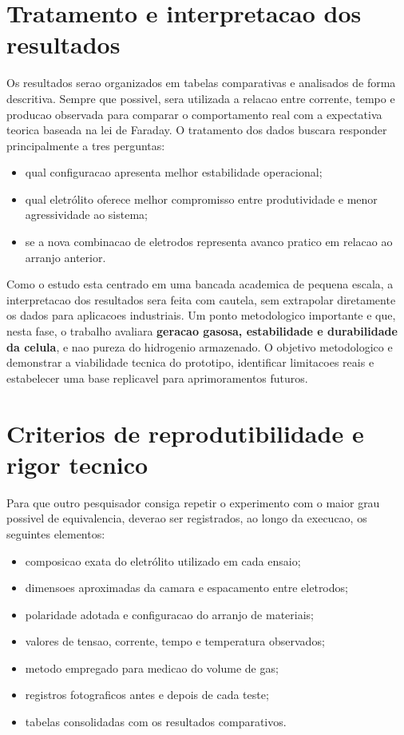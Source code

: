 \documentclass[12pt,oneside,a4paper,brazilian]{abntex2}
\begin{document}
\section{Tratamento e interpretacao dos resultados}

Os resultados serao organizados em tabelas comparativas e analisados de forma descritiva. Sempre que possivel, sera utilizada a relacao entre corrente, tempo e producao observada para comparar o comportamento real com a expectativa teorica baseada na lei de Faraday. O tratamento dos dados buscara responder principalmente a tres perguntas:

\begin{itemize}
  \item qual configuracao apresenta melhor estabilidade operacional;
  \item qual eletrólito oferece melhor compromisso entre produtividade e menor agressividade ao sistema;
  \item se a nova combinacao de eletrodos representa avanco pratico em relacao ao arranjo anterior.
\end{itemize}

Como o estudo esta centrado em uma bancada academica de pequena escala, a interpretacao dos resultados sera feita com cautela, sem extrapolar diretamente os dados para aplicacoes industriais. Um ponto metodologico importante e que, nesta fase, o trabalho avaliara \textbf{geracao gasosa, estabilidade e durabilidade da celula}, e nao pureza do hidrogenio armazenado. O objetivo metodologico e demonstrar a viabilidade tecnica do prototipo, identificar limitacoes reais e estabelecer uma base replicavel para aprimoramentos futuros.

\section{Criterios de reprodutibilidade e rigor tecnico}

Para que outro pesquisador consiga repetir o experimento com o maior grau possivel de equivalencia, deverao ser registrados, ao longo da execucao, os seguintes elementos:

\begin{itemize}
  \item composicao exata do eletrólito utilizado em cada ensaio;
  \item dimensoes aproximadas da camara e espacamento entre eletrodos;
  \item polaridade adotada e configuracao do arranjo de materiais;
  \item valores de tensao, corrente, tempo e temperatura observados;
  \item metodo empregado para medicao do volume de gas;
  \item registros fotograficos antes e depois de cada teste;
  \item tabelas consolidadas com os resultados comparativos.
\end{itemize}
\end{document}
